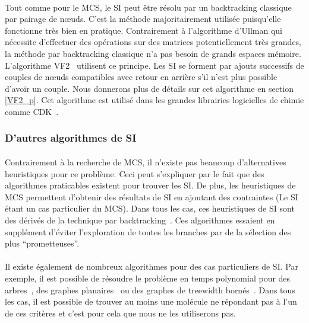 \documentclass[12pt,french,twoside]{report}
\begin{document}
\paragraph{}Tout comme pour le MCS, le SI peut être résolu par un backtracking classique par pairage de n\oe{}uds.
C'est la méthode majoritairement utilisée puisqu'elle fonctionne très bien en pratique.
Contrairement à l'algorithme d'Ullman qui nécessite d'effectuer des opérations sur des matrices potentiellement très grandes, la méthode par backtracking classique n'a pas besoin de grands espaces mémoire.
L'algorithme VF2~\cite{cordella_subgraph_2004} utilisent ce principe.
Les SI se forment par ajouts successifs de couples de n\oe{}uds compatibles avec retour en arrière s'il n'est plus possible d'avoir un couple.
Nous donnerons plus de détails sur cet algorithme en section \ref{VF2_p}.
Cet algorithme est utilisé dans les grandes librairies logicielles de chimie comme CDK~\cite{steinbeck_chemistry_2003}.


\subsubsection{D'autres algorithmes de SI}

\paragraph{}Contrairement à la recherche de MCS, il n'existe pas beaucoup d'alternatives heuristiques pour ce problème.
Ceci peut s'expliquer par le fait que des algorithmes praticables existent pour trouver les SI.
De plus, les heuristiques de MCS permettent d'obtenir des résultats de SI en ajoutant des contraintes (Le SI étant un cas particulier du MCS).
Dans tous les cas, ces heuristiques de SI sont des dérivés de la technique par backtracking~\cite{kaijar_developing_2012}.
Ces algorithmes essaient en supplément d'éviter l'exploration de toutes les branches par de la sélection des plus ``prometteuses''.

\paragraph{}Il existe également de nombreux algorithmes pour des cas particuliers de SI.
Par exemple, il est possible de résoudre le problème en temps polynomial pour des arbres~\cite{shamir_faster_1997}, des graphes planaires~\cite{eppstein_subgraph_1995,dorn_planar_2009} ou des graphes de treewidth bornés~\cite{hajiaghayi_subgraph_2007}.
Dans tous les cas, il est possible de trouver au moins une molécule ne répondant pas à l'un de ces critères et c'est pour cela que nous ne les utiliserons pas.
\end{document}
